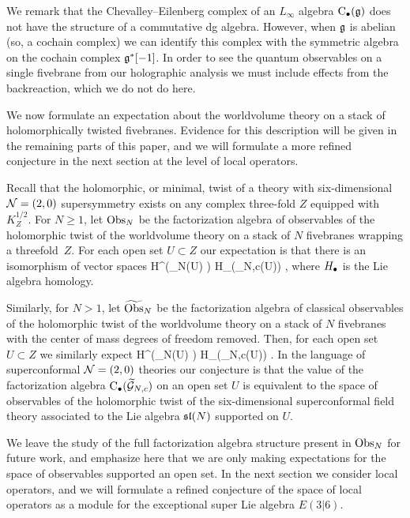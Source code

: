 We remark that the Chevalley--Eilenberg complex of an $L_\infty$ algebra ${\rm C}_\bullet(\mathfrak{g})$ does not have the structure of a commutative dg algebra.
However, when $\mathfrak{g}$ is abelian (so, a cochain complex) we can identify this complex with the symmetric algebra on the cochain complex $\mathfrak g^*[-1]$.
In order to see the quantum observables on a single fivebrane from our holographic analysis we must include effects from the backreaction, which we do not do here.

We now formulate an expectation about the worldvolume theory on a stack of holomorphically twisted fivebranes.
Evidence for this description will be given in the remaining parts of this paper, and we will formulate a more refined conjecture in the next section at the level of local operators.

Recall that the holomorphic, or minimal, twist of a theory with six-dimensional $\mathcal N=(2,0)$ supersymmetry exists on any complex three-fold $Z$ equipped with $K_Z^{1/2}$.
For $N \geq 1$, let $\operatorname{Obs}_{N}$ be the factorization algebra of observables of the holomorphic twist of the worldvolume theory on a stack of $N$ fivebranes wrapping a threefold~$Z$. 
For each open set $U \subset Z$ our expectation is that there is an isomorphism of vector spaces
\beqn
H^\bu \left(\Obs_N(U) \right) \simeq H_\bu (\cG_{N,c}(U)) ,
\eeqn
where $H_\bullet$ is the Lie algebra homology.

Similarly, for $N > 1$, let $\widetilde {\operatorname{Obs}}_N$ be the factorization algebra of classical observables of the holomorphic twist of the worldvolume theory on a stack of $N$ fivebranes with the center of mass degrees of freedom removed.
Then, for each open set $U \subset Z$ we similarly expect
\beqn
H^\bu \left(\til\Obs_N(U) \right) \simeq H_\bu (\til \cG_{N,c}(U)) .
\eeqn
In the language of superconformal $\mathcal N=(2,0)$ theories our conjecture is that the value of the factorization algebra ${\rm C}_\bullet(\widetilde {\mathcal G}_{N,c})$ on an open set $U$ is equivalent to the space of observables of the holomorphic twist of the six-dimensional superconformal field theory associated to the Lie algebra $\mathfrak{sl}(N)$ supported on $U$.

We leave the study of the full factorization algebra structure present in $\operatorname{Obs}_N$ for future work, and emphasize here that we are only making expectations for the space of observables supported an open set.
In the next section we consider local operators, and we will formulate a refined conjecture of the space of local operators as a module for the exceptional super Lie algebra $E(3|6)$. 


%
